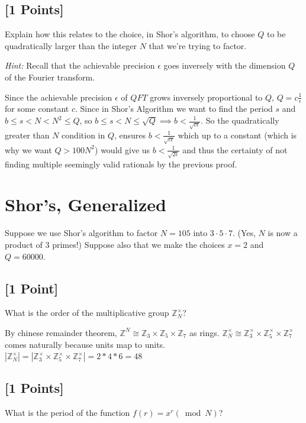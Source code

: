 \documentclass[11pt]{article}
\newcommand{\Z}{\mathbb{Z}}
\newcommand{\abs}[1]{\left\lvert #1\right\rvert}
\begin{document}
\subsection{[1 Points]}
Explain how this relates to the choice, in Shor's algorithm, to choose $Q$ to be quadratically larger than the integer $N$ that we're trying to factor. 

\noindent \emph{Hint:} Recall that the achievable precision $\epsilon$ goes inversely with the dimension $Q$ of the Fourier transform.
\begin{solution}
    Since the achievable precision $\epsilon$ of $QFT$ grows inversely proportional to $Q$, $Q = c\frac{1}{\epsilon}$ for some constant $c$. Since in Shor's Algorithm we want to find the period $s$ and $b \leq s < N < N^2 \leq Q$, so $b \leq s < N \leq \sqrt{Q} \implies b < \frac{1}{\sqrt{c \epsilon}}$. So the quadratically greater than $N$ condition in $Q$, ensures $b < \frac{1}{\sqrt{c \epsilon}}$ which up to a constant (which is why we want $Q > 100N^2$) would give us $b < \frac{1}{\sqrt{2 \epsilon}}$ and thus the certainty of not finding multiple seemingly valid rationals by the previous proof.      
\end{solution}


\section{Shor's, Generalized}
Suppose we use Shor's algorithm to factor $N=105$ into $3\cdot 5 \cdot 7$.  (Yes, $N$ is now a product of 3 primes!)  Suppose also that we make the choices $x=2$ and $Q=60000$.

\subsection{[1 Point]} What is the order of the multiplicative group $\mathbb{Z}_N^\times$?

\begin{solution}
    By chinese remainder theorem, $\Z^N \cong \Z_3 \times \Z_5 \times \Z_7$ as rings. 
    $\Z^\times_N \cong \Z^\times_3 \times \Z^\times_5 \times \Z^\times_7$ comes naturally because units map to units. $\abs{\Z^\times_N} = \abs{\Z^\times_3 \times \Z^\times_5 \times \Z^\times_7} = 2 * 4 * 6 = 48$     
\end{solution}

\subsection{[1 Points]} What is the period of the function $f(r)=x^r (\bmod N)$?
\end{document}
